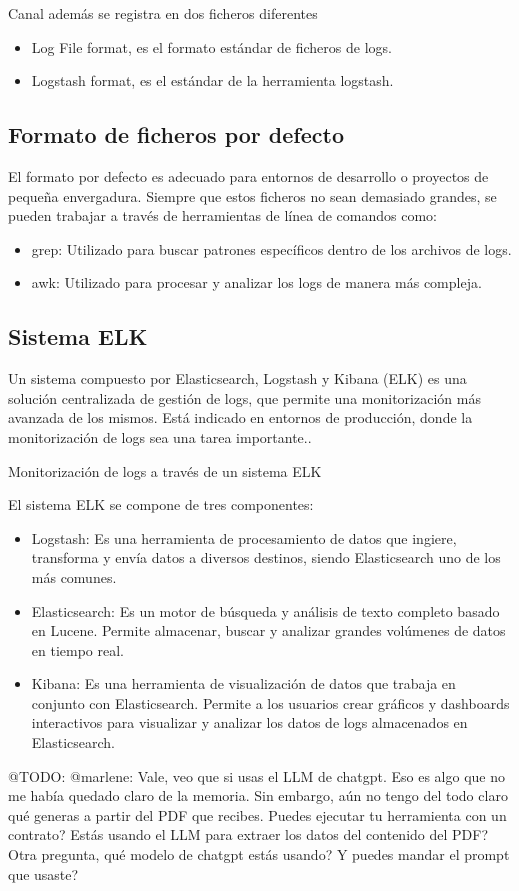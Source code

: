 Canal además se registra en dos ficheros diferentes

\begin{itemize}
    \item Log File format, es el formato estándar de ficheros de logs.
    \item Logstash format, es el estándar de la herramienta logstash.
\end{itemize}

\subsection*{Formato de ficheros por defecto}
El formato por defecto es adecuado para entornos de desarrollo o proyectos de pequeña envergadura. Siempre que estos
ficheros no sean demasiado grandes, se pueden trabajar a través de herramientas de línea de comandos como:

\begin{itemize}
    \item grep: Utilizado para buscar patrones específicos dentro de los archivos de logs.
    \item awk: Utilizado para procesar y analizar los logs de manera más compleja.
\end{itemize}

\subsection*{Sistema ELK}
Un sistema compuesto por Elasticsearch, Logstash y Kibana (ELK) es una solución centralizada de gestión de logs, que
permite una monitorización más avanzada de los mismos. Está indicado en entornos de producción, donde la monitorización
de logs sea una tarea importante..


Monitorización de logs a través de un sistema ELK

El sistema ELK se compone de tres componentes:

\begin{itemize}
    \item
    Logstash: Es una herramienta de procesamiento de datos que ingiere, transforma y envía datos a diversos destinos,
    siendo Elasticsearch uno de los más comunes.
    \item
    Elasticsearch: Es un motor de búsqueda y análisis de texto completo basado en Lucene. Permite almacenar, buscar y
    analizar grandes volúmenes de datos en tiempo real.
    \item Kibana: Es una herramienta de visualización de datos que trabaja en conjunto con Elasticsearch. Permite a los
    usuarios crear gráficos y dashboards interactivos para visualizar y analizar los datos de logs almacenados en
    Elasticsearch.
\end{itemize}


\colorbox{color_highlight}{@TODO: @marlene:}
Vale, veo que si usas el LLM de chatgpt. Eso es algo que no me había quedado claro de la memoria. Sin embargo, aún
no
tengo del todo claro qué generas a partir del PDF que recibes. Puedes ejecutar tu herramienta con un contrato? Estás
usando el LLM para extraer los datos del contenido del PDF? Otra pregunta, qué modelo de chatgpt estás usando? Y
puedes
mandar el prompt que usaste?